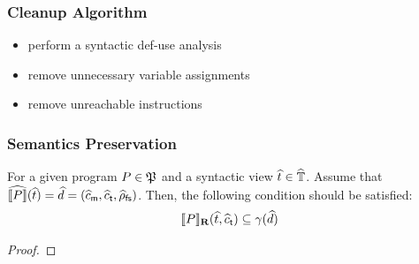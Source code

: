 \subsubsection{Cleanup Algorithm}

\todo

\begin{itemize}
  \item perform a syntactic def-use analysis
  \item remove unnecessary variable assignments
  \item remove unreachable instructions
\end{itemize}


\subsubsection{Semantics Preservation}

% 

\todo

\begin{theorem}
  For a given program $P \in \mathfrak{P}$ and a syntactic view $\widehat{t} \in
  \widehat{\mathbb{T}}$. Assume that $\widehat{\llbracket{P}\rrbracket}(\widehat{t}) = \widehat{d} = (\widehat{c}_{\textsf{m}}, \widehat{c}_{\textsf{t}},
  \widehat{\rho}_{\textsf{fs}})$. Then, the following condition should be satisfied:
  \[
    \llbracket{P}\rrbracket_\textbf{R}(\widehat{t}, \widehat{c}_{\textsf{t}}) \subseteq \gamma(\widehat{d})
  \]
\end{theorem}
\begin{proof}
  \todo
\end{proof}

